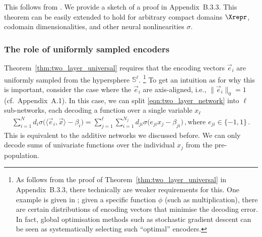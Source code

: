 This follows from \citet{hornik1989multilayer}.
We provide a sketch of a proof in Appendix~B.3.3.
This theorem can be easily extended to hold for arbitrary compact domains $\Xrepr$, codomain dimensionalities, and other neural nonlinearities $\sigma$.


\subsubsection{The role of uniformly sampled encoders}
Theorem~\ref{thm:two_layer_universal} requires that the encoding vectors $\vec e_i$ are uniformly sampled from the hypersphere $\mathbb{S}^\ell$.%
\footnote{As follows from the proof of Theorem~\ref{thm:two_layer_universal} in Appendix~B.3.3, there technically are weaker requirements for this.
One example is given in \citet{gosmann2015precise}; given a specific function $\phi$ (such as multiplication), there are certain distributions of encoding vectors that minimise the decoding error.
In fact, global optimisation methods such as stochastic gradient descent can be seen as systematically selecting such \enquote{optimal} encoders.}
To get an intuition as for why this is important, consider the case where the $\vec e_i$ are axis-aligned, i.e., $\|\vec e_i\|_0 = 1$ (cf.~Appendix~A.1).
In this case, we can split \cref{eqn:two_layer_network} into $\ell$ sub-networks, each decoding a function over a single variable $x_\ell$
\begin{align*}
		\sum_{i = 1}^N d_i \sigma\bigl( \langle \vec e_i, \vec x \rangle - \beta_i \bigr)
	= 	\sum_{j = 1}^\ell \sum_{i = 1}^{N_j} d_{j i} \sigma\bigl( e_{j i} x_j - \beta_{j i} \bigr) \,, \text{where } e_{j i} \in \{ -1, 1\} \,.
\end{align*}
This is equivalent to the additive networks we discussed before.
We can only decode sums of univariate functions over the individual $x_j$ from the pre-population.

